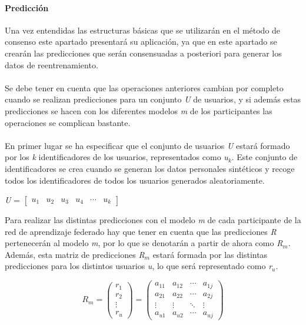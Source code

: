 \paragraph{Predicción} Una vez entendidas las estructuras básicas que se utilizarán en el método de consenso este apartado presentará su aplicación, ya que en este apartado se crearán las predicciones que serán consensuadas a posteriori para generar los datos de reentrenamiento.
\\ \\
Se debe tener en cuenta que las operaciones anteriores cambian por completo cuando se realizan predicciones para un conjunto \textit{U} de usuarios, y si además estas predicciones se hacen con los diferentes modelos \textit{m} de los participantes las operaciones se complican bastante. 
\\ \\
En primer lugar se ha especificar que el conjunto de usuarios \textit{U} estará formado por los \textit{k} identificadores de los usuarios, representados como \textit{u$_{k}$}. Este conjunto de identificadores se crea cuando se generan los datos personales sintéticos y recoge todos los identificadores de todos los usuarios generados aleatoriamente.
\begin{center}
    \textit{U} = $\begin{bmatrix} \textit{u$_{1}$} & \textit{u$_{2}$} & \textit{u$_{3}$} & \textit{u$_{4}$} & \cdots & \textit{u$_{k}$} \end{bmatrix}$ 
\end{center}
Para realizar las distintas predicciones con el modelo \textit{m} de cada participante de la red de aprendizaje federado hay que tener en cuenta que las predicciones \textit{R} pertenecerán al modelo \textit{m}, por lo que  se denotarán a partir de ahora como \textit{R$_{m}$}. Además, esta matriz de predicciones \textit{R$_{m}$} estará formada por las distintas predicciones para los distintos usuarios \textit{u}, lo que será representado como \textit{r$_{u}$}.
\begin{center}
    \[  \textit{R$_{m}$} = 
        \begin{pmatrix}
            \textit{r$_{1}$}  \\ 
            \textit{r$_{2}$}  \\ 
            \vdots  \\ 
            \textit{r$_{u}$}
        \end{pmatrix} 
        =
        \begin{pmatrix}
            a_{11}  &  a_{12}  &  \cdots   & a_{1j} \\ 
            a_{21}  &  a_{22}  &  \cdots   & a_{2j}\\ 
            \vdots  &  \vdots  &  \ddots & \vdots  \\ 
            a_{u1}  &  a_{u2}  &  \cdots   & a_{uj}
        \end{pmatrix}
    \]
\end{center}
\newpage
